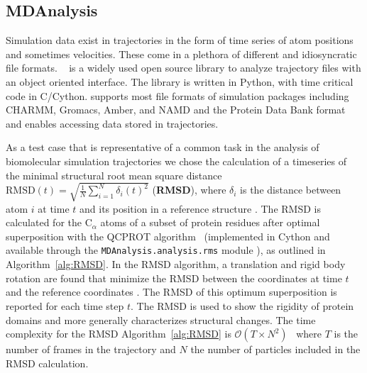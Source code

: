 \label{use_cases}

\subsection{MDAnalysis}
\label{sec:mda}

Simulation data exist in trajectories in the form of time series of atom positions and sometimes velocities. These come in a plethora of different and idiosyncratic file formats. 
~\citep{Gowers:2016aa,Michaud-Agrawal:2011fu} is a widely used open source library to analyze trajectory files with an object oriented interface. 
The library is written in Python, with time critical code in C/Cython. 
 supports most file formats of simulation packages including CHARMM, Gromacs, Amber, and NAMD and the Protein Data Bank format and enables accessing data stored in trajectories. 
 
As a test case that is representative of a common task in the analysis of biomolecular simulation trajectories we chose the calculation of a timeseries of the minimal structural root mean square distance $\text{RMSD}(t)=\sqrt{\frac{1}{N}\sum_{i=1}^{N}\delta_{i}(t)^{2}}$ (\textbf{RMSD}), where $\delta_{i}$ is the distance between atom $i$ at time $t$ and its position in a reference structure \cite{Lea96, Mura:2014kx}. 
The RMSD is calculated for the  C$_{\alpha}$ atoms of a subset of protein residues after 
optimal superposition with the QCPROT algorithm~\cite{Liu:2010kx,Theobald:2005vn} (implemented in Cython and available through the \texttt{MDAnalysis.analysis.rms} module \cite{Gowers:2016aa}), as outlined in Algorithm~\ref{alg:RMSD}. 
In the RMSD algorithm, a translation and rigid body rotation are found that minimize the RMSD between the coordinates at time $t$ and the reference coordinates \cite{Liu:2010kx}. 
The RMSD of this optimum superposition is reported for each time step $t$.
The RMSD is used to show the rigidity of protein domains and more generally characterizes structural changes.
The time complexity for the RMSD Algorithm~\ref{alg:RMSD} is $\mathcal{O}(T \times N^{2})$~\cite{Liu:2010kx} where $T$ is the number of frames in the trajectory and $N$ the number of particles included in the RMSD calculation.


